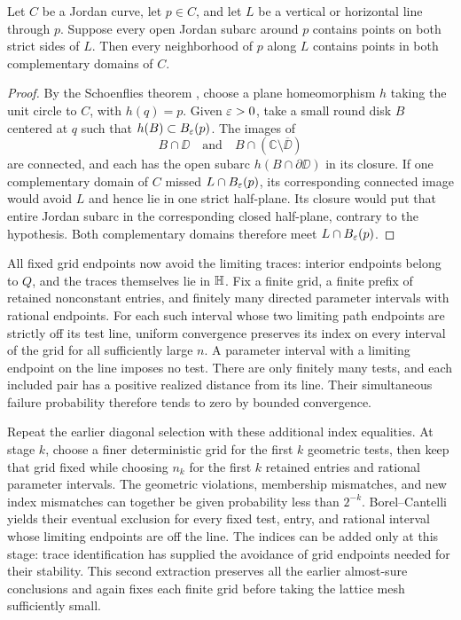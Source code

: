 \begin{lemma}\label{lem:jordan-line}
Let $C$ be a Jordan curve, let $p\in C$, and let $L$ be a vertical or horizontal line through $p$. Suppose every open Jordan subarc around $p$ contains points on both strict sides of $L$. Then every neighborhood of $p$ along $L$ contains points in both complementary domains of $C$.
\end{lemma}

\begin{proof}
By the Schoenflies theorem \cite[Section~1]{Cairns}, choose a plane homeomorphism $h$ taking the unit circle to $C$, with $h(q)=p$. Given $\varepsilon>0$, take a small round disk $B$ centered at $q$ such that $h(B)\subset B_\varepsilon(p)$. The images of
\[
 B\cap\DD\quad\text{and}\quad
 B\cap(\mathbb C\setminus\overline\DD)
\]
are connected, and each has the open subarc $h(B\cap\partial\DD)$ in its closure. If one complementary domain of $C$ missed $L\cap B_\varepsilon(p)$, its corresponding connected image would avoid $L$ and hence lie in one strict half-plane. Its closure would put that entire Jordan subarc in the corresponding closed half-plane, contrary to the hypothesis. Both complementary domains therefore meet $L\cap B_\varepsilon(p)$.
\end{proof}

All fixed grid endpoints now avoid the limiting traces: interior endpoints belong to $Q$, and the traces themselves lie in $\mathbb H$. Fix a finite grid, a finite prefix of retained nonconstant entries, and finitely many directed parameter intervals with rational endpoints. For each such interval whose two limiting path endpoints are strictly off its test line, uniform convergence preserves its index on every interval of the grid for all sufficiently large $n$. A parameter interval with a limiting endpoint on the line imposes no test. There are only finitely many tests, and each included pair has a positive realized distance from its line. Their simultaneous failure probability therefore tends to zero by bounded convergence.

Repeat the earlier diagonal selection with these additional index equalities. At stage $k$, choose a finer deterministic grid for the first $k$ geometric tests, then keep that grid fixed while choosing $n_k$ for the first $k$ retained entries and rational parameter intervals. The geometric violations, membership mismatches, and new index mismatches can together be given probability less than $2^{-k}$. Borel--Cantelli yields their eventual exclusion for every fixed test, entry, and rational interval whose limiting endpoints are off the line. The indices can be added only at this stage: trace identification has supplied the avoidance of grid endpoints needed for their stability. This second extraction preserves all the earlier almost-sure conclusions and again fixes each finite grid before taking the lattice mesh sufficiently small.

